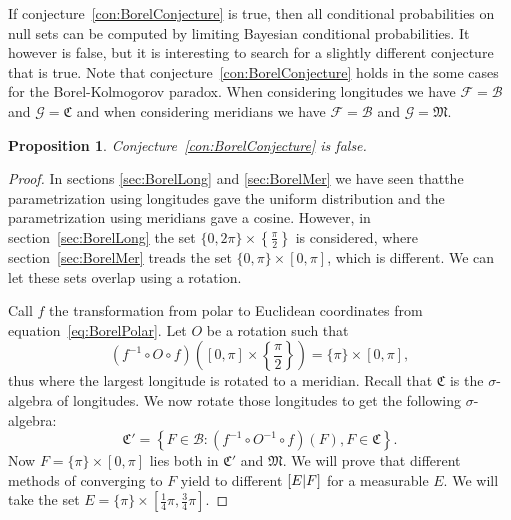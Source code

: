\documentclass[twoside,a4paper]{report}
\theoremstyle{plain}
\newtheorem{proposition}[theorem]{Proposition}
\theoremstyle{definition}
\theoremstyle{remark}
\numberwithin{equation}{chapter}
\let\P\relax
\DeclareMathOperator{\P}{\mathbb{P}}
\DeclareMathOperator{\1}{\mathbbm{1}}
\newcommand{\F}{\mathcal{F}}
\renewcommand{\G}{\mathcal{G}}
\newcommand{\B}{\mathcal{B}}
\begin{document}
If conjecture~\ref{con:BorelConjecture} is true, then all conditional probabilities on null sets can be computed by limiting Bayesian conditional probabilities. It however is false, but it is interesting to search for a slightly different conjecture that is true. Note that conjecture~\ref{con:BorelConjecture} holds in the some cases for the Borel-Kolmogorov paradox. When considering longitudes we have $\F=\B$ and $\G=\mathfrak{C}$ and when considering meridians we have $\F=\B$ and $\G=\mathfrak{M}$.

\begin{proposition}\label{prop:BorelConFalse}
Conjecture~\ref{con:BorelConjecture} is false.
\end{proposition}
\begin{proof}
In sections \ref{sec:BorelLong} and \ref{sec:BorelMer} we have seen thatthe parametrization using longitudes gave the uniform distribution and the parametrization using meridians gave a cosine. However, in section~\ref{sec:BorelLong} the set $\{0,2\pi\}\times\left\{\frac{\pi}{2}\right\}$ is considered, where section~\ref{sec:BorelMer} treads the set $\{0,\pi\}\times[0,\pi]$, which is different. We can let these sets overlap using a rotation.

Call $f$ the transformation from polar to Euclidean coordinates from equation~\ref{eq:BorelPolar}. Let $O$ be a rotation such that
\begin{equation}
(f^{-1}\circ O\circ f)\left([0,\pi]\times\left\{\frac{\pi}{2}\right\}\right)=\{\pi\}\times[0,\pi],
\end{equation}
thus where the largest longitude is rotated to a meridian. Recall that $\mathfrak{C}$ is the $\sigma$-algebra of longitudes. We now rotate those longitudes to get the following $\sigma$-algebra:
\begin{equation}
\mathfrak{C}'=\left\{F\in\B:\left(f^{-1}\circ O^{-1}\circ f\right)(F),F\in\mathfrak{C}\right\}.
\end{equation}
Now $F=\{\pi\}\times[0,\pi]$ lies both in $\mathfrak{C}'$ and $\mathfrak{M}$. We will prove that different methods of converging to $F$ yield to different $\P[E|F]$ for a measurable $E$. We will take the set $E=\{\pi\}\times\left[\frac{1}{4}\pi,\frac{3}{4}\pi\right]$.


\end{proof}
\end{document}

